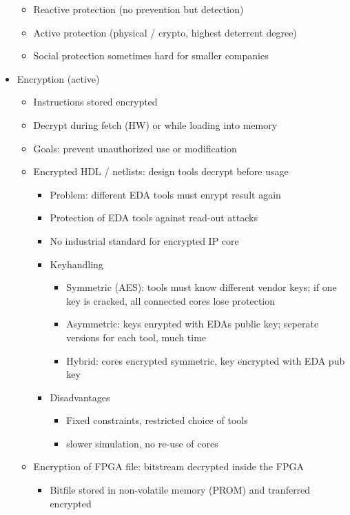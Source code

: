\documentclass[11pt, paper=a4, twocolumn]{scrartcl}
\begin{document}
\begin{itemize}
\begin{itemize}
					\item Reactive protection (no prevention but detection)
					\item Active protection (physical / crypto, highest deterrent degree)
					\item Social protection sometimes hard for smaller companies
				\end{itemize}
			\item Encryption (active)
				\begin{itemize}
					\item Instructions stored encrypted
					\item Decrypt during fetch (HW) or while loading into memory
					\item Goals: prevent unauthorized use or modification
					\item Encrypted HDL / netlists: design tools decrypt before usage
						\begin{itemize}
							\item Problem: different EDA tools must enrypt result again
							\item Protection of EDA tools against read-out attacks
							\item No industrial standard for encrypted IP core
							\item Keyhandling
								\begin{itemize}
									\item Symmetric (AES): tools must know different vendor keys; if one key is 
										cracked, all connected cores lose protection
									\item Asymmetric: keys enrypted with EDAs public key; seperate versions for each 
										tool, much time
									\item Hybrid: cores encrypted symmetric, key encrypted with EDA pub key
								\end{itemize}
							\item Disadvantages
								\begin{itemize}
									\item Fixed constraints, restricted choice of tools
									\item slower simulation, no re-use of cores
								\end{itemize}
						\end{itemize}
					\item Encryption of FPGA file: bitstream decrypted inside the FPGA
						\begin{itemize}
							\item Bitfile stored in non-volatile memory (PROM) and tranferred encrypted

\end{itemize}
\end{itemize}
\end{itemize}
\end{document}
